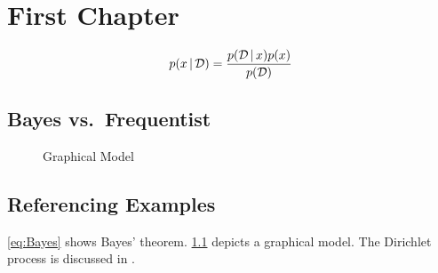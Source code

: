\chapter{First Chapter}

\blindtext
\begin{equation}
	p(x \,|\, \mathcal{D}) = \frac{ p(\mathcal{D} \,|\, x) p(x) }{ p(\mathcal{D}) }
	\label{eq:Bayes}
\end{equation}
\blindtext

\section{Bayes vs.\ Frequentist}
\blindtext

\begin{figure}
	\centering
	\caption{Graphical Model}
	\label{fig:GM}
\end{figure}

\blindtext

\section{Referencing Examples}
\cref{eq:Bayes} shows Bayes' theorem. \cref{fig:GM} depicts a graphical model. The Dirichlet process is discussed in \cite{ferguson1973bayesian}.